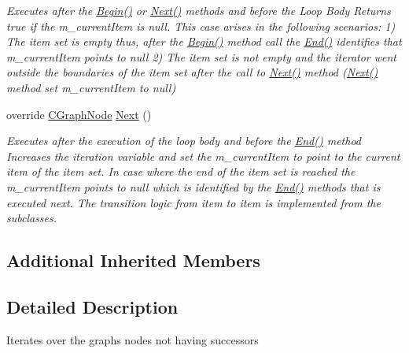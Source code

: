 \begin{DoxyCompactItemize}
\begin{DoxyCompactList}\small\item\em Executes after the \hyperlink{class_graph_library_1_1_c_it___graph_leaf_nodes_a7f9ce52d3e6c908a50abc991f77b805d}{Begin()} or \hyperlink{class_graph_library_1_1_c_it___graph_leaf_nodes_aa6f30fbeebae338fa9d77455027679f0}{Next()} methods and before the Loop Body Returns true if the m\+\_\+current\+Item is null. This case arises in the following scenarios\+: 1) The item set is empty thus, after the \hyperlink{class_graph_library_1_1_c_it___graph_leaf_nodes_a7f9ce52d3e6c908a50abc991f77b805d}{Begin()} method call the \hyperlink{class_graph_library_1_1_c_it___graph_leaf_nodes_a7a249d8774ff2fef55f20ae8dc1d0fac}{End()} identifies that m\+\_\+current\+Item points to null 2) The item set is not empty and the iterator went outside the boundaries of the item set after the call to \hyperlink{class_graph_library_1_1_c_it___graph_leaf_nodes_aa6f30fbeebae338fa9d77455027679f0}{Next()} method (\hyperlink{class_graph_library_1_1_c_it___graph_leaf_nodes_aa6f30fbeebae338fa9d77455027679f0}{Next()} method set m\+\_\+current\+Item to null) \end{DoxyCompactList}\item 
override \hyperlink{class_graph_library_1_1_c_graph_node}{C\+Graph\+Node} \hyperlink{class_graph_library_1_1_c_it___graph_leaf_nodes_aa6f30fbeebae338fa9d77455027679f0}{Next} ()
\begin{DoxyCompactList}\small\item\em Executes after the execution of the loop body and before the \hyperlink{class_graph_library_1_1_c_it___graph_leaf_nodes_a7a249d8774ff2fef55f20ae8dc1d0fac}{End()} method Increases the iteration variable and set the m\+\_\+current\+Item to point to the current item of the item set. In case where the end of the item set is reached the m\+\_\+current\+Item points to null which is identified by the \hyperlink{class_graph_library_1_1_c_it___graph_leaf_nodes_a7a249d8774ff2fef55f20ae8dc1d0fac}{End()} methods that is executed next. The transition logic from item to item is implemented from the subclasses. \end{DoxyCompactList}\end{DoxyCompactItemize}
\subsection*{Additional Inherited Members}


\subsection{Detailed Description}
Iterates over the graph\textquotesingle{}s nodes not having successors 



